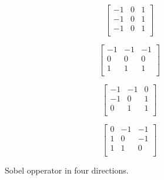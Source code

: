 \begin{figure}[ht]
  \begin{minipage}{0.24\linewidth}
    \centering
    \[\left[\begin{array}{ccc}
    -1 & 0 & 1\\
    -1 & 0 & 1\\
    -1 & 0 & 1\\
    \end{array}\right]\]
  \end{minipage}%
    \begin{minipage}{0.24\linewidth}
    \centering
    \[\left[\begin{array}{ccc}
    -1 & -1 & -1\\
    0 & 0 & 0\\
    1 & 1 & 1\\
    \end{array}\right]\]
  \end{minipage}%
    \begin{minipage}{0.24\linewidth}
    \centering
    \[\left[\begin{array}{ccc}
    -1 & -1 & 0\\
    -1 & 0 & 1\\
    0 & 1 & 1\\
    \end{array}\right]\]
  \end{minipage}%
    \begin{minipage}{0.24\linewidth}
    \centering
    \[\left[\begin{array}{ccc}
    0 & -1 & -1\\
    1 & 0 & -1\\
    1 & 1 & 0\\
    \end{array}\right]\]
  \end{minipage}%
  \caption{Sobel opperator in four directions.}
  \label{mat:method:sobel:2d}
\end{figure}

